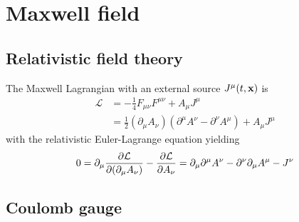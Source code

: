 \section{Maxwell field}

\subsection{Relativistic field theory}

The Maxwell Lagrangian with an external source $J^\mu(t,\vb{x})$ is
\begin{equation}
	\begin{split}
		\mathcal{L}
		&=
		-
		\frac{1}{4}
		F_{\mu\nu}
		F^{\mu\nu}
		+
		A_\mu J^\mu
		\\
		&=
		\frac{1}{2}
		\left(\partial_\mu A_\nu\right)
		\left(\partial^\mu A^\nu-\partial^\nu A^\mu\right)
		+
		A_\mu J^\mu
	\end{split}
	\label{eq:mw_lagrangian}
\end{equation}
with the relativistic Euler-Lagrange equation yielding
\begin{equation}
	0
	=
	\partial_\mu\pdv{\mathcal{L}}{(\partial_\mu A_\nu)}
	-
	\pdv{\mathcal{L}}{A_\nu}
	=
	\partial_\mu\partial^\mu A^\nu
	-
	\partial^\nu\partial_\mu A^\mu
	-
	J^\nu	
	\label{eq:mw_eom}	
\end{equation}

\subsection{Coulomb gauge}

